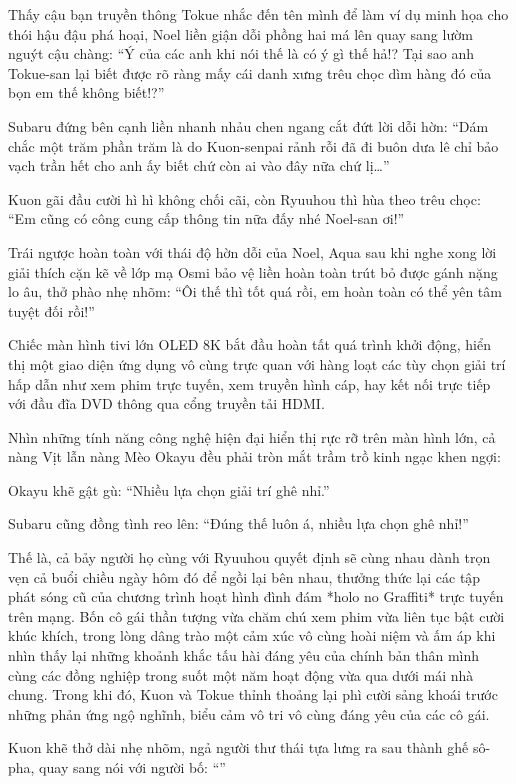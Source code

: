 \documentclass[../main.tex]{subfiles}
\begin{document}
Thấy cậu bạn truyền thông Tokue nhắc đến tên mình để làm ví dụ minh họa cho thói hậu đậu phá hoại, Noel liền giận dỗi phồng hai má lên quay sang lườm nguýt cậu chàng: ``Ý của các anh khi nói thế là có ý gì thế hả!? Tại sao anh Tokue-san lại biết được rõ ràng mấy cái danh xưng trêu chọc dìm hàng đó của bọn em thế không biết!?''

Subaru đứng bên cạnh liền nhanh nhảu chen ngang cắt đứt lời dỗi hờn: ``Dám chắc một trăm phần trăm là do Kuon-senpai rảnh rỗi đã đi buôn dưa lê chỉ bảo vạch trần hết cho anh ấy biết chứ còn ai vào đây nữa chứ lị\dots''

Kuon gãi đầu cười hì hì không chối cãi, còn Ryuuhou thì hùa theo trêu chọc: ``Em cũng có công cung cấp thông tin nữa đấy nhé Noel-san ơi!''

Trái ngược hoàn toàn với thái độ hờn dỗi của Noel, Aqua sau khi nghe xong lời giải thích cặn kẽ về lớp mạ Osmi bảo vệ liền hoàn toàn trút bỏ được gánh nặng lo âu, thở phào nhẹ nhõm: ``Ôi thế thì tốt quá rồi, em hoàn toàn có thể yên tâm tuyệt đối rồi!''

Chiếc màn hình tivi lớn OLED 8K bắt đầu hoàn tất quá trình khởi động, hiển thị một giao diện ứng dụng vô cùng trực quan với hàng loạt các tùy chọn giải trí hấp dẫn như xem phim trực tuyến, xem truyền hình cáp, hay kết nối trực tiếp với đầu đĩa DVD thông qua cổng truyền tải HDMI.

Nhìn những tính năng công nghệ hiện đại hiển thị rực rỡ trên màn hình lớn, cả nàng Vịt lẫn nàng Mèo Okayu đều phải tròn mắt trầm trồ kinh ngạc khen ngợi:

Okayu khẽ gật gù: ``Nhiều lựa chọn giải trí ghê nhỉ.''

Subaru cũng đồng tình reo lên: ``Đúng thế luôn á, nhiều lựa chọn ghê nhỉ!''

Thế là, cả bảy người họ cùng với Ryuuhou quyết định sẽ cùng nhau dành trọn vẹn cả buổi chiều ngày hôm đó để ngồi lại bên nhau, thưởng thức lại các tập phát sóng cũ của chương trình hoạt hình đình đám *holo no Graffiti* trực tuyến trên mạng. Bốn cô gái thần tượng vừa chăm chú xem phim vừa liên tục bật cười khúc khích, trong lòng dâng trào một cảm xúc vô cùng hoài niệm và ấm áp khi nhìn thấy lại những khoảnh khắc tấu hài đáng yêu của chính bản thân mình cùng các đồng nghiệp trong suốt một năm hoạt động vừa qua dưới mái nhà chung. Trong khi đó, Kuon và Tokue thỉnh thoảng lại phì cười sảng khoái trước những phản ứng ngộ nghĩnh, biểu cảm vô tri vô cùng đáng yêu của các cô gái.

Kuon khẽ thở dài nhẹ nhõm, ngả người thư thái tựa lưng ra sau thành ghế sô-pha, quay sang nói với người bố: ``''
\end{document}
